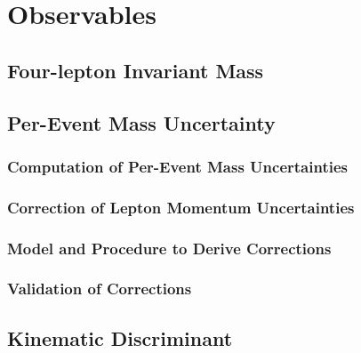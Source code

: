 \section{Observables}\label{sec:observables}

\subsection{Four-lepton Invariant Mass}\label{subsec:observ/fourl_mass}

\subsection{Per-Event Mass Uncertainty}\label{subsec:observ/per_event_mass_uncert}
\subsubsection{Computation of Per-Event Mass Uncertainties}\label{subsubsec:compute_per_event_uncert}
\subsubsection{Correction of Lepton Momentum Uncertainties}\label{subsubsec:lep_momentum_uncert}
\subsubsection{Model and Procedure to Derive Corrections}\label{subsubsec:derive_corrections}
\subsubsection{Validation of Corrections}\label{subsubsec:validate_corrections}

\subsection{Kinematic Discriminant}\label{subsec:observables/D_kin_bkg}